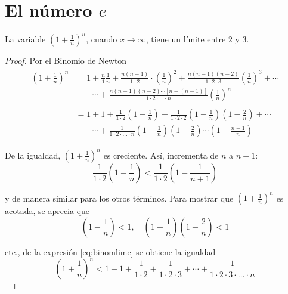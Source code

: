 \section{El número $e$}

\begin{theorem}
  La variable \( (1 + \frac{1}{n})^n \), cuando \( x \to \infty \), tiene un límite entre \(2\) y \(3\).
\end{theorem}

\begin{proof}
  Por el Binomio de Newton
  \begin{align} \label{eq:binomlime}
    \begin{split}
      \left( 1 + \frac{1}{n} \right)^n & = 1
      + \frac{n}{1} \frac{1}{n}
      + \frac{n(n - 1)}{1 \cdot 2} \cdot \left( \frac{1}{n} \right)^2
      + \frac{n(n - 1)(n - 2)}{1 \cdot 2 \cdot 3} \left( \frac{1}{n} \right)^3
      + \cdots
      \\ & \qquad
      \cdots
      + \frac{n(n - 1)(n - 2) \cdots [n - (n - 1)]}
             {1 \cdot 2 \cdot \ldots \cdot n} \left( \frac{1}{n} \right)^n
      \\\\
      & = 1
      + 1
      + \frac{1}{1 \cdot 2} \left( 1 - \frac{1}{n} \right)
      + \frac{1}{1 \cdot 2 \cdot 2}
        \left( 1 - \frac{1}{n} \right)
        \left( 1 - \frac{2}{n} \right)
      + \cdots
      \\ & \qquad
      \cdots
      + \frac{1}{1 \cdot 2 \cdot \ldots \cdot n}
        \left( 1 - \frac{1}{n} \right)
        \left( 1 - \frac{2}{n} \right)
        \cdots
        \left( 1 - \frac{n - 1}{n} \right)
    \end{split}
  \end{align}

  De la igualdad, \( \left( 1 + \frac{1}{n} \right)^n \) es creciente. Así, incrementa de \(n\) a \(n + 1\):
  \[ \frac{1}{1 \cdot 2} \left( 1 - \frac{1}{n} \right) < \frac{1}{1 \cdot 2} \left( 1 - \frac{1}{n + 1} \right) \]

  y de manera similar para los otros términos. Para mostrar que \( \left( 1 + \frac{1}{n} \right)^n \) es acotada, se aprecia que
  \[ \left( 1 - \frac{1}{n} \right) < 1, \quad \left( 1 - \frac{1}{n} \right) \left( 1 - \frac{2}{n} \right) < 1 \]

  etc., de la expresión \ref{eq:binomlime} se obtiene la igualdad
  \[ \left( 1 + \frac{1}{n} \right)^n < 1 + 1 + \frac{1}{1 \cdot 2} + \frac{1}{1 \cdot 2 \cdot 3} + \cdots + \frac{1}{1 \cdot 2 \cdot 3 \cdot \ldots \cdot n} \]


\end{proof}

